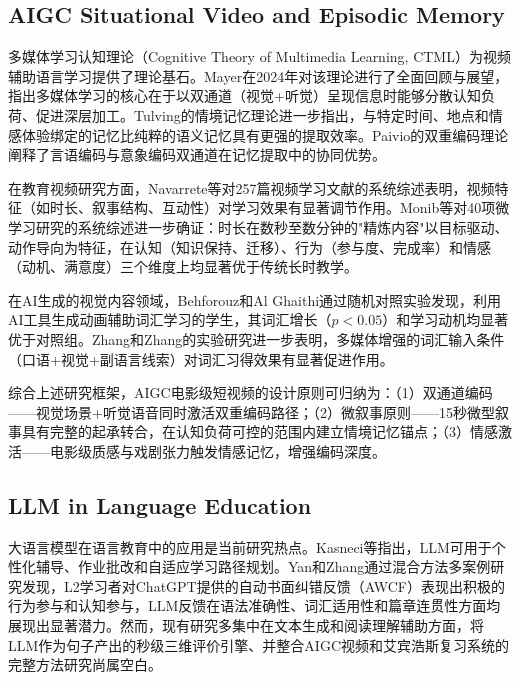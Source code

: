 \documentclass[Afour,sageapa,times]{sagej}
\begin{document}
\subsection{AIGC Situational Video and Episodic Memory}

多媒体学习认知理论（Cognitive Theory of Multimedia Learning, CTML）为视频辅助语言学习提供了理论基石。Mayer在2024年对该理论进行了全面回顾与展望，指出多媒体学习的核心在于以双通道（视觉+听觉）呈现信息时能够分散认知负荷、促进深层加工\cite{mayer2024past}。Tulving的情境记忆理论进一步指出，与特定时间、地点和情感体验绑定的记忆比纯粹的语义记忆具有更强的提取效率\cite{tulving1983elements}。Paivio的双重编码理论阐释了言语编码与意象编码双通道在记忆提取中的协同优势\cite{paivio1991dual}。

在教育视频研究方面，Navarrete等\cite{navarrete2025closer}对257篇视频学习文献的系统综述表明，视频特征（如时长、叙事结构、互动性）对学习效果有显著调节作用。Monib等\cite{khan2025microlearning}对40项微学习研究的系统综述进一步确证：时长在数秒至数分钟的"精炼内容"以目标驱动、动作导向为特征，在认知（知识保持、迁移）、行为（参与度、完成率）和情感（动机、满意度）三个维度上均显著优于传统长时教学。

在AI生成的视觉内容领域，Behforouz和Al Ghaithi\cite{behforouz2025visual}通过随机对照实验发现，利用AI工具生成动画辅助词汇学习的学生，其词汇增长（$p<0.05$）和学习动机均显著优于对照组。Zhang和Zhang\cite{zhang2024multimedia}的实验研究进一步表明，多媒体增强的词汇输入条件（口语+视觉+副语言线索）对词汇习得效果有显著促进作用。

综合上述研究框架，AIGC电影级短视频的设计原则可归纳为：（1）双通道编码——视觉场景+听觉语音同时激活双重编码路径；（2）微叙事原则——15秒微型叙事具有完整的起承转合，在认知负荷可控的范围内建立情境记忆锚点；（3）情感激活——电影级质感与戏剧张力触发情感记忆，增强编码深度。

\subsection{LLM in Language Education}

大语言模型在语言教育中的应用是当前研究热点。Kasneci等指出，LLM可用于个性化辅导、作业批改和自适应学习路径规划\cite{kasneci2023chatgpt}。Yan和Zhang\cite{yan2024l2}通过混合方法多案例研究发现，L2学习者对ChatGPT提供的自动书面纠错反馈（AWCF）表现出积极的行为参与和认知参与，LLM反馈在语法准确性、词汇适用性和篇章连贯性方面均展现出显著潜力。然而，现有研究多集中在文本生成和阅读理解辅助方面，将LLM作为句子产出的秒级三维评价引擎、并整合AIGC视频和艾宾浩斯复习系统的完整方法研究尚属空白。
\end{document}
